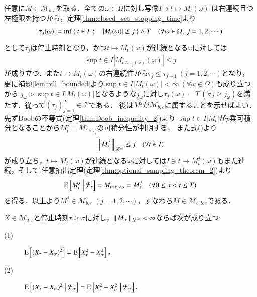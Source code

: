 	\begin{prf}
		任意に$M \in \mathcal{M}_{p,c}$を取る．全ての$\omega \in \Omega$に対し写像$I \ni t \longmapsto M_t(\omega)$
		は右連続且つ左極限を持つから，定理\ref{thm:closed_set_stopping_time}より
		\begin{align}
			\tau_j(\omega) \coloneqq \operatorname*{inf}_{} \left\{\ t \in I\ \, ; \quad |M_t(\omega)| \geq j\ \right\} \wedge T \quad (\forall \omega \in \Omega,\ j=1,2,\cdots)
		\end{align}
		として$\tau_j$は停止時刻となり，かつ$t \longmapsto M_t(\omega)$が連続となる$\omega$に対しては
		\begin{align}
			\sup{t \in I}{\left| M_{t \wedge \tau_j(\omega)}(\omega) \right|} \leq j
			\label{eq:M_pc_M_cloc}
		\end{align}
		が成り立つ．また$t \longmapsto M_t(\omega)$の右連続性から$\tau_j \leq \tau_{j+1}\ (j=1,2,\cdots)$となり，
		更に補題\ref{lem:rcll_bounded}より$\sup{t \in I}{|M_t(\omega)|} < \infty\ (\forall \omega \in \Omega)$も成り立つから
		$j_\omega > \sup{t \in I}{|M_t(\omega)|}$となるような$j_\omega$に対し$\tau_j(\omega) = T\ (\forall j \geq j_\omega)$を満たす．従って$(\tau_j)_{j=1}^{\infty} \in \mathcal{T}$である．
		後は$M^j$が$\mathcal{M}_{b,c}$に属することを示せばよい．先ずDoobの不等式(定理\ref{thm:Doob_inequality_2})より
		$\sup{t \in I}{|M_t|}$が$p$乗可積分となることから$M_t^j = M_{t \wedge \tau_j}$の可積分性が判明する．
		また式()より
		\begin{align}
			\left\|\, M_t^j\, \right\|_{\mathscr{L}^\infty} \leq j \quad (\forall t \in I)
		\end{align}
		が成り立ち，$t \longmapsto M_t(\omega)$が連続となる$\omega$に対しては$I \ni t \longmapsto M_t^j(\omega)$もまた連続，そして
		任意抽出定理(定理\ref{thm:optional_sampling_theorem_2})より
		\begin{align}
			\operatorname{E} \left[ M_t^j \ \middle|\ \mathcal{F}_s \right] = M_{t \wedge \tau_j \wedge s} = M_s^j \quad (\forall 0 \leq s < t \leq T)
		\end{align}
		を得る．以上より$M^j \in \mathcal{M}_{b,c}\ (j=1,2,\cdots)$，すなわち$M \in \mathcal{M}_{c,loc}$である．
		\QED
	\end{prf}
	
	\begin{itembox}[l]{}
		\begin{lem}
			$X \in \mathcal{M}_{2,c}$と停止時刻$\tau \geq \sigma$に対し，$\left\|\, M_\sigma\, \right\|_{\mathscr{L}^\infty} < \infty$ならば次が成り立つ:
			\begin{description}
				\item[(1)] $\operatorname{E} \left[ (X_{\tau} - X_{\sigma})^2 \right] = \operatorname{E} \left[ X_{\tau}^2 - X_{\sigma}^2 \right]$，
				\item[(2)] $\operatorname{E} \left[ (X_{\tau} - X_{\sigma})^2 \ \middle|\ \mathcal{F}_\sigma \right] = \operatorname{E} \left[ X_{\tau}^2 - X_{\sigma}^2 \ \middle|\ \mathcal{F}_\sigma \right]$．
			\end{description}
			\label{lem:stopping_time_telescopic_sum}
		\end{lem}
	\end{itembox}
	
